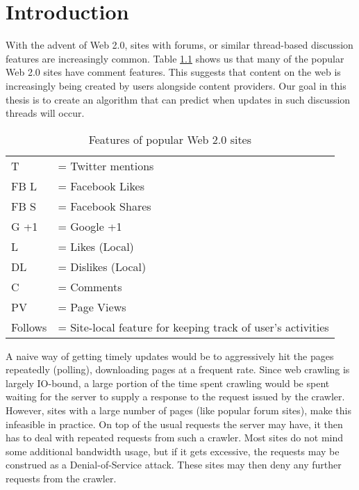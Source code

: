 \chapter{Introduction}

With the advent of Web 2.0, sites with forums, or similar thread-based
discussion features are increasingly common.  Table \ref{table:web20} shows us 
that many of the popular Web 2.0 sites have comment features. This suggests that 
content on the web is increasingly being created by users alongside content 
providers. Our goal in this thesis is to create an algorithm that can predict 
when updates in such discussion threads will occur.

\begin{table}
	{\footnotesize
\caption{Features of popular Web 2.0 sites}
\label{table:web20}
	\begin{tabular}{l l}
		T &= Twitter mentions\\
	 FB L &= Facebook Likes \\
		FB S &= Facebook Shares\\
	G +1 &= Google +1\\
		   L&= Likes (Local) \\
   		DL &= Dislikes (Local) \\
			C &= Comments \\
		PV &= Page Views \\
   Follows &= Site-local feature for keeping track of user's activities
	\end{tabular}
}
\end{table}

A naive way of getting timely updates would be to aggressively hit the pages 
repeatedly (polling), downloading pages at a frequent rate. Since web crawling 
is largely IO-bound, a large portion of the time spent crawling would be spent 
waiting for the server to supply a response to the request issued by the 
crawler. However, sites with a large number of pages (like popular forum sites), 
make this infeasible in practice. On top of the usual requests the server may 
have, it then has to deal with repeated requests from such a crawler. Most sites 
do not mind some additional bandwidth usage, but if it gets excessive, the 
requests may be construed as a Denial-of-Service attack. These sites may then 
deny any further requests from the crawler.

